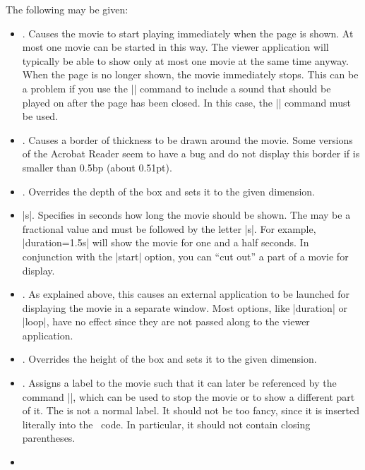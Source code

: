 \begin{command}{\movie{}}
  The following  may be given:
  \begin{itemize}
  \item
    . Causes the movie to start playing immediately
    when the page is shown. At most one movie can be started in this
    way. The viewer application will typically be able to show only at
    most one movie at the same time anyway. When the page is no longer
    shown, the movie immediately stops. This can be a problem if you
    use the |\movie| command to include a sound that should be played
    on after the page has been closed. In this case, the |\sound|
    command must be used.
  \item
    . Causes a border of
    thickness  to be drawn around the
    movie. Some versions of the Acrobat Reader seem to have a bug and
    do not display this border if is smaller than 0.5bp (about
    0.51pt).
  \item
    . Overrides the depth of the
     box and sets it to the given dimension.
  \item
    |s|. Specifies in seconds how long
    the movie should be shown. The  may be a fractional
    value and must be followed by the letter |s|. For example,
    |duration=1.5s| will show the movie for one and a half seconds. In
    conjunction with the |start| option, you can ``cut out'' a part of
    a movie for display.
  \item
    . As explained above, this causes an
    external application to be launched for displaying the movie in a
    separate window. Most options, like |duration| or |loop|, have no
    effect since they are not passed along to the viewer application.
  \item
    . Overrides the height of the
     box and sets it to the given dimension.
  \item
    . Assigns a label to the movie
    such that it can later be referenced by the command
    |\hyperlinkmovie|, which can be used to stop the movie or to show
    a different part of it. The  is not a normal
    label. It should not be too fancy, since it is inserted literally
    into the \pdf\ code. In particular, it should not contain closing
    parentheses.
  \item

\end{itemize}
\end{command}

